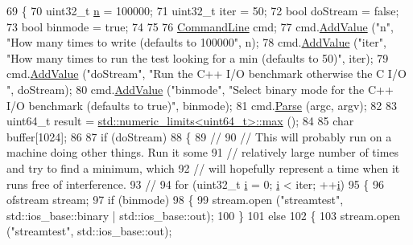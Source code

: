 \begin{DoxyCode}
69 \{
70   uint32\_t \hyperlink{namespacesample-rng-plot_aeb5ee5c431e338ef39b7ac5431242e1d}{n} = 100000;
71   uint32\_t iter = 50;
72   \textcolor{keywordtype}{bool} doStream = \textcolor{keyword}{false};
73   \textcolor{keywordtype}{bool} binmode = \textcolor{keyword}{true};
74  
75 
76   \hyperlink{classns3_1_1CommandLine}{CommandLine} cmd;
77   cmd.\hyperlink{classns3_1_1CommandLine_addcfb546c7ad4c8bd0965654d55beb8e}{AddValue} (\textcolor{stringliteral}{"n"}, \textcolor{stringliteral}{"How many times to write (defaults to 100000"}, n);
78   cmd.\hyperlink{classns3_1_1CommandLine_addcfb546c7ad4c8bd0965654d55beb8e}{AddValue} (\textcolor{stringliteral}{"iter"}, \textcolor{stringliteral}{"How many times to run the test looking for a min (defaults to 50)"}, iter);
79   cmd.\hyperlink{classns3_1_1CommandLine_addcfb546c7ad4c8bd0965654d55beb8e}{AddValue} (\textcolor{stringliteral}{"doStream"}, \textcolor{stringliteral}{"Run the C++ I/O benchmark otherwise the C I/O "}, doStream);
80   cmd.\hyperlink{classns3_1_1CommandLine_addcfb546c7ad4c8bd0965654d55beb8e}{AddValue} (\textcolor{stringliteral}{"binmode"}, \textcolor{stringliteral}{"Select binary mode for the C++ I/O benchmark (defaults to true)"}, 
      binmode);
81   cmd.\hyperlink{classns3_1_1CommandLine_a5c10b85b3207e5ecb48d907966923156}{Parse} (argc, argv);
82 
83   uint64\_t result = \hyperlink{80211b_8c_affe776513b24d84b39af8ab0930fef7f}{std::numeric\_limits<uint64\_t>::max} ();
84 
85   \textcolor{keywordtype}{char} buffer[1024];
86 
87   \textcolor{keywordflow}{if} (doStream)
88     \{
89       \textcolor{comment}{//}
90       \textcolor{comment}{// This will probably run on a machine doing other things.  Run it some}
91       \textcolor{comment}{// relatively large number of times and try to find a minimum, which}
92       \textcolor{comment}{// will hopefully represent a time when it runs free of interference.}
93       \textcolor{comment}{//}
94       \textcolor{keywordflow}{for} (uint32\_t \hyperlink{bernuolliDistribution_8m_a6f6ccfcf58b31cb6412107d9d5281426}{i} = 0; \hyperlink{bernuolliDistribution_8m_a6f6ccfcf58b31cb6412107d9d5281426}{i} < iter; ++\hyperlink{bernuolliDistribution_8m_a6f6ccfcf58b31cb6412107d9d5281426}{i})
95         \{
96           ofstream stream;
97           \textcolor{keywordflow}{if} (binmode)
98             \{
99               stream.open (\textcolor{stringliteral}{"streamtest"}, std::ios\_base::binary | std::ios\_base::out);
100             \}
101           \textcolor{keywordflow}{else}
102             \{
103               stream.open (\textcolor{stringliteral}{"streamtest"}, std::ios\_base::out);

\end{DoxyCode}
